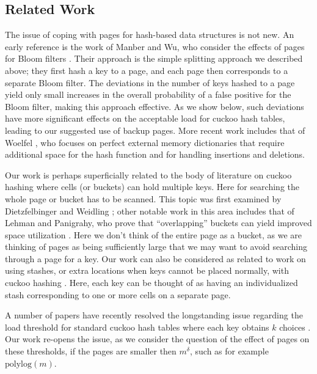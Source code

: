 \let\accentvec\vec \documentclass{llncs}
\begin{document}
\subsection{Related Work}
The issue of coping with pages for hash-based data structures is not
new.  An early reference is the work of Manber and Wu, who consider
the effects of pages for Bloom filters
\cite{manber1994algorithm}. Their approach is the simple splitting approach we
described above; they first hash a key to a page, and each page then
corresponds to a separate Bloom filter.  The deviations in the number
of keys hashed to a page yield only small increases in the overall
probability of a false positive for the Bloom filter, making this
approach effective.  As we show below, such deviations
have more significant effects on the acceptable load for cuckoo
hash tables, leading to our suggested use of backup pages.  More recent
work includes that of Woelfel \cite{woelfel2006maintaining}, who
focuses on perfect external memory dictionaries that require
additional space for the hash function and for handling insertions and
deletions.

Our work is perhaps superficially related to the body of literature on
cuckoo hashing where cells (or buckets) can hold multiple keys. 
Here for searching the whole page or bucket has to be scanned.
This topic was first examined by Dietzfelbinger and Weidling
\cite{dietzfelbinger2007balanced}; other notable work in this area
includes that of Lehman and Panigrahy, who prove that ``overlapping''
buckets can yield improved space utilization \cite{LehmanP2009}.  Here
we don't think of the entire page as a bucket, as we are thinking of
pages as being sufficiently large that we may want to avoid searching
through a page for a key.  Our work can also be considered as related
to work on using stashes, or extra locations when keys cannot be
placed normally, with cuckoo hashing \cite{kirsch2008more}.  Here,
each key can be thought of as having an individualized stash corresponding
to one or more cells on a separate page.

A number of papers have recently resolved the longstanding issue regarding the load
threshold for standard cuckoo hash tables where each key obtains $k$
choices
\cite{dietzfelbinger2010tight,fountoulakis2011multiple,fountoulakis2010orientability,frieze2009maximum,GaoWormald2010}.
Our work re-opens the issue, as we consider the question of the effect
of pages on these thresholds, if the pages are smaller then
$m^\delta$, such as for example $\mathrm{polylog}(m)$.
\end{document}
